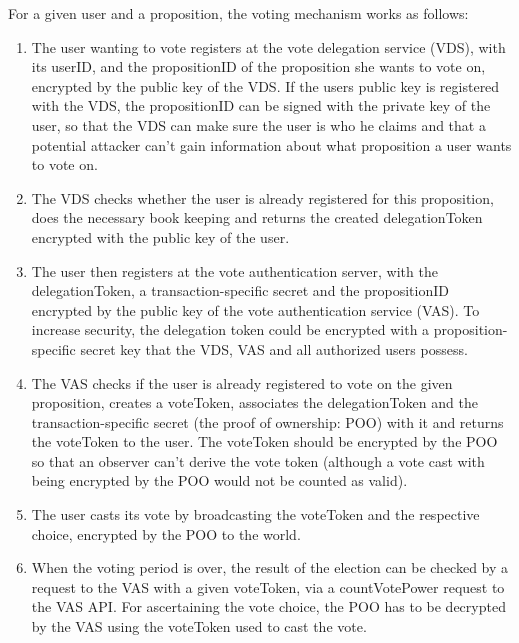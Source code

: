 For a given user and a proposition, the voting mechanism works as follows:
\begin{enumerate}
\item The user wanting to vote registers at the 
vote delegation service (VDS), with its userID, and the propositionID of the proposition she wants to vote on, encrypted by the public key of the VDS. If the users public key is registered with the VDS, the propositionID can be signed with the private key of the user, so that the VDS can make sure  the user is who he claims and that a potential attacker can't gain information about what proposition a user wants to vote on.
\item The VDS checks whether the user is already registered for this proposition, does the necessary book keeping and returns the created delegationToken encrypted with the public key of the user.
\item The user then registers at the vote authentication server, with the delegationToken, a transaction-specific secret and the propositionID encrypted by the public key of the vote authentication service (VAS). To increase security, the delegation token could be encrypted with a proposition-specific secret key that the VDS, VAS and all authorized users possess.
\item The VAS checks if the user is already registered to vote on the given proposition, creates a voteToken, associates the delegationToken and the transaction-specific secret (the proof of ownership: POO) with it and returns the voteToken to the user. The voteToken should be encrypted by the POO so that an observer can't derive the vote token (although a vote cast with being encrypted by the POO would not be counted as valid).
\item The user casts its vote by broadcasting the voteToken and the respective choice, encrypted by the POO to the world. 
\item When the voting period is over, the result of the election can be checked by a request to the VAS with a given voteToken, via a countVotePower request to the VAS API. For ascertaining the vote choice, the POO has to be decrypted by the VAS using the voteToken used to cast the vote.
\end{enumerate}

